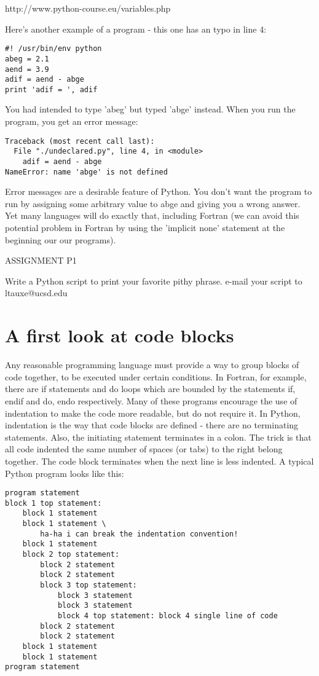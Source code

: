 {http://www.python-course.eu/variables.php

Here's another example of a program - this one has an typo in line 4:

{\singlespacing \color{blue} \begin{verbatim}
#! /usr/bin/env python
abeg = 2.1
aend = 3.9
adif = aend - abge
print 'adif = ', adif
\end{verbatim}}

\noindent
You had intended to type 'abeg' but typed 'abge' instead.  When
you run the program, you get an error message:

{\singlespacing \color{blue} \begin{verbatim}
Traceback (most recent call last):
  File "./undeclared.py", line 4, in <module>
    adif = aend - abge
NameError: name 'abge' is not defined
\end{verbatim}}

\noindent
Error messages are a desirable feature of Python.  You don't want the program
to run by assigning some arbitrary value to abge and giving you
a wrong answer.  Yet many languages will do exactly that, including
Fortran (we can avoid this potential problem in Fortran by using the 
'implicit none' statement at the beginning our our programs).

\noindent
{\singlespacing \color{red} ASSIGNMENT  P1

  Write a Python script to print your favorite pithy phrase. e-mail your script to ltauxe@ucsd.edu}

\section{A first look at code blocks}
Any reasonable programming language must provide a way to group blocks of code together, to be executed under certain conditions.  In Fortran, for example, there are if statements and do loops which are bounded by the statements if, endif and do, endo respectively.  Many of these programs encourage the use of indentation to make the code more readable, but do not require it.  In Python, indentation is the way that code blocks are defined - there are no terminating statements. Also, the initiating statement terminates in a colon.  The trick is that all code indented the same number of spaces (or tabs) to the right belong together.  The code block terminates when the next line is less indented.     A typical Python program looks like this: 

{\singlespacing \color{blue}\begin {verbatim}
program statement
block 1 top statement:
    block 1 statement
    block 1 statement \
        ha-ha i can break the indentation convention!
    block 1 statement
    block 2 top statement:
        block 2 statement
        block 2 statement
        block 3 top statement:
            block 3 statement
            block 3 statement
            block 4 top statement: block 4 single line of code
        block 2 statement
        block 2 statement
    block 1 statement
    block 1 statement
program statement
\end{verbatim}}


}
